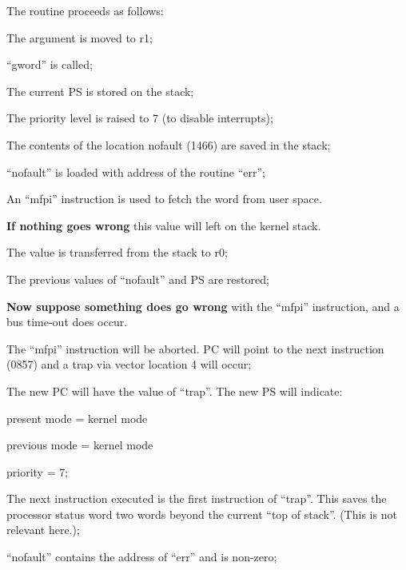 The routine proceeds as follows:

\bd
\item[0846:] The argument is moved to r1;

\item[0848:] ``gword'' is called;

\item[0852:] The current PS is stored on the
 stack;

\item[0853:] The priority level is raised to 7
 (to disable interrupts);

\item[0854:] The contents of the location
 nofault (1466) are saved in the
 stack;

\item[0855:] ``nofault'' is loaded with
 address of the routine ``err'';

\item[0856:] An ``mfpi'' instruction is used to
 fetch the word from user space.
\ed

{\bf If nothing goes wrong} this value will
 left on the kernel stack.

\bd
\item[0857:] The value is transferred from the
 stack to r0;

\item[0876:] The previous values of ``nofault''
 and PS are restored;
\ed


{\bf Now suppose something does go wrong}
with the ``mfpi'' instruction, and a bus
time-out does occur.

\bd
\item[0856:] The ``mfpi'' instruction will be
 aborted. PC will point to the
 next instruction (0857) and a
 trap via vector location 4 will
 occur;

\item[0512:] The new PC will have the value of
 ``trap''. The new PS will indicate:

present mode = kernel mode

previous mode = kernel mode

priority = 7;

\item[0756:] The next instruction executed is
 the first instruction of ``trap''.
 This saves the processor status
 word two words beyond the current
 ``top of stack''. (This is not
 relevant here.);

\item[0757:] ``nofault'' contains the address of 
 ``err'' and is non-zero;

